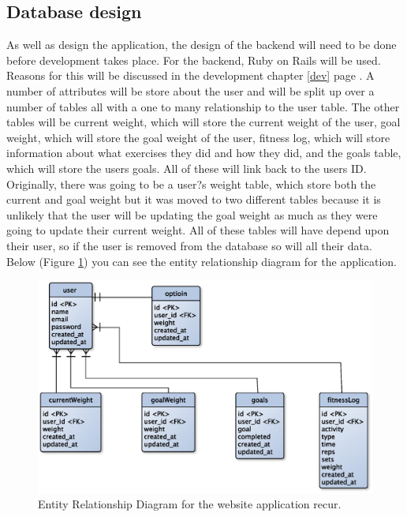 \subsection{Database design}
As well as design the application, the design of the backend will need to be done before development takes place. For the backend, Ruby on Rails \citep{rails:2013} will be used. Reasons for this will be discussed in the development chapter \ref{dev} page \pageref{dev}. A number of attributes will be store about the user and will be split up over a number of tables all with a one to many relationship to the user table. The other tables will be current weight, which will store the current weight of the user, goal weight, which will store the goal weight of the user, fitness log, which will store information about what exercises they did and how they did, and the goals table, which will store the users goals. All of these will link back to the users ID. Originally, there was going to be a user?s weight table, which store both the current and goal weight but it was moved to two different tables because it is unlikely that the user will be updating the goal weight as much as they were going to update their current weight. All of these tables will have depend upon their user, so if the user is removed from the database so will all their data. Below (Figure \ref{fig:erd}) you can see the entity relationship diagram for the application.

\begin{figure}[!ht]
\centering
\includegraphics[scale=0.5]{chapters/figs/erd}
\caption{Entity Relationship Diagram for the website application recur.}
\label{fig:erd}
\end{figure}
